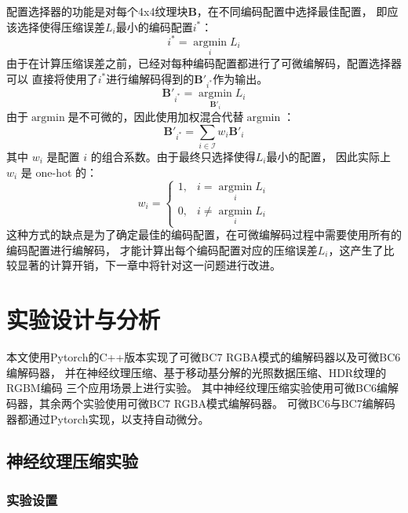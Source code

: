 配置选择器的功能是对每个4x4纹理块$\mathbf{B}$，在不同编码配置中选择最佳配置，
即应该选择使得压缩误差$L_i$最小的编码配置$i^*$：
\begin{equation}
    i^*=\mathop{\arg\min}\limits_{i} L_i
\end{equation}
由于在计算压缩误差之前，已经对每种编码配置都进行了可微编解码，配置选择器可以
直接将使用了$i^*$进行编解码得到的$\mathbf{B}'_{i^*}$作为输出。
\begin{equation}
    \mathbf{B}'_{i^*}=\mathop{\arg\min}\limits_{\mathbf{B}'_i} L_i
\end{equation}
由于$\mathop{\arg\min}$是不可微的，因此使用加权混合代替$\mathop{\arg\min}$：
\begin{equation}
\mathbf{B}'_{i^*}=\sum_{i\in\mathcal{I}} w_i\mathbf{B}'_i
\end{equation}
其中 $w_i$ 是配置 $i$ 的组合系数。由于最终只选择使得$L_i$最小的配置，
因此实际上 $w_i$ 是 one-hot 的：
\begin{equation}
    w_i =\left\{\begin{matrix}
        1,& i=\mathop{\arg\min}\limits_{i} L_i
        \\0,& i\ne\mathop{\arg\min}\limits_{i} L_i
        \end{matrix}\right.
\end{equation}
这种方式的缺点是为了确定最佳的编码配置，在可微编解码过程中需要使用所有的编码配置进行编解码，
才能计算出每个编码配置对应的压缩误差$L_i$，这产生了比较显著的计算开销，下一章中将针对这一问题进行改进。



\section{实验设计与分析}

本文使用Pytorch的C++版本实现了可微BC7 RGBA模式的编解码器以及可微BC6编解码器，
并在神经纹理压缩、基于移动基分解的光照数据压缩、HDR纹理的RGBM编码
三个应用场景上进行实验。
其中神经纹理压缩实验使用可微BC6编解码器，其余两个实验使用可微BC7 RGBA模式编解码器。
可微BC6与BC7编解码器都通过Pytorch实现，以支持自动微分。

\subsection{神经纹理压缩实验}

\subsubsection{实验设置}

